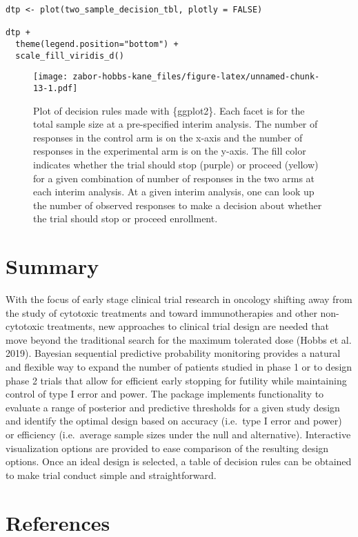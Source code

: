 \begin{verbatim}
dtp <- plot(two_sample_decision_tbl, plotly = FALSE)

dtp + 
  theme(legend.position="bottom") + 
  scale_fill_viridis_d()
\end{verbatim}

\begin{figure}
\centering
\texttt{[image: zabor-hobbs-kane\_files/figure-latex/unnamed-chunk-13-1.pdf]}
\caption{\label{fig:unnamed-chunk-13}Plot of decision rules made with \{ggplot2\}. Each facet is for the total sample size at a pre-specified interim analysis. The number of responses in the control arm is on the x-axis and the number of responses in the experimental arm is on the y-axis. The fill color indicates whether the trial should stop (purple) or proceed (yellow) for a given combination of number of responses in the two arms at each interim analysis. At a given interim analysis, one can look up the number of observed responses to make a decision about whether the trial should stop or proceed enrollment.}
\end{figure}

\hypertarget{summary}{%
\section{Summary}\label{summary}}

With the focus of early stage clinical trial research in oncology shifting away from the study of cytotoxic treatments and toward immunotherapies and other non-cytotoxic treatments, new approaches to clinical trial design are needed that move beyond the traditional search for the maximum tolerated dose (Hobbs et al. 2019). Bayesian sequential predictive probability monitoring provides a natural and flexible way to expand the number of patients studied in phase 1 or to design phase 2 trials that allow for efficient early stopping for futility while maintaining control of type I error and power. The  package implements functionality to evaluate a range of posterior and predictive thresholds for a given study design and identify the optimal design based on accuracy (i.e.~type I error and power) or efficiency (i.e.~average sample sizes under the null and alternative). Interactive visualization options are provided to ease comparison of the resulting design options. Once an ideal design is selected, a table of decision rules can be obtained to make trial conduct simple and straightforward.

\hypertarget{references}{%
\section*{References}\label{references}}

